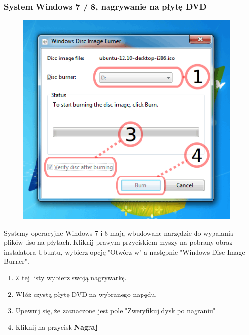 \subsubsection{System Windows 7 / 8, nagrywanie na płytę DVD}
\begin{figure}
		\includegraphics[width=\linewidth]{images/instalacja_nagrywanie_obrazu_DVD.png}
\end{figure}
Systemy operacyjne Windows 7 i 8 mają wbudowane narzędzie do wypalania plików .iso na płytach. Kliknij prawym przyciskiem myszy na pobrany obraz instalatora Ubuntu, wybierz opcję "Otwórz w" a następnie "Windows Disc Image Burner".
\begin{enumerate}
\item Z tej listy wybierz swoją nagrywarkę.
\item Włóż czystą płytę DVD na wybranego napędu.
\item Upewnij się, że zaznaczone jest pole "Zweryfikuj dysk po nagraniu"
\item Kliknij na przycisk \textbf{Nagraj}
\end{enumerate}
\clearpage
